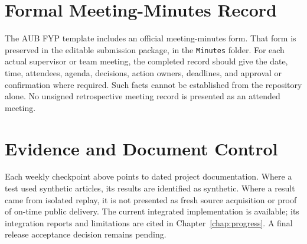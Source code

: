\section{Formal Meeting-Minutes Record}
The AUB FYP template includes an official meeting-minutes form. That form is preserved in the editable submission package, in the \texttt{Minutes} folder. For each actual supervisor or team meeting, the completed record should give the date, time, attendees, agenda, decisions, action owners, deadlines, and approval or confirmation where required. Such facts cannot be established from the repository alone. No unsigned retrospective meeting record is presented as an attended meeting.

\section{Evidence and Document Control}
Each weekly checkpoint above points to dated project documentation. Where a test used synthetic articles, its results are identified as synthetic. Where a result came from isolated replay, it is not presented as fresh source acquisition or proof of on-time public delivery. The current integrated implementation is available; its integration reports and limitations are cited in Chapter~\ref{chap:progress}. A final release acceptance decision remains pending.
